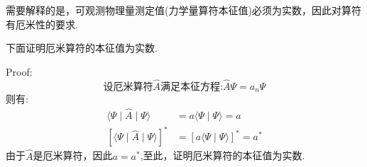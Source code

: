 \documentclass[28pt,openany]{book}
\begin{document}
需要解释的是，可观测物理量测定值(力学量算符本征值)必须为实数，因此对算符有厄米性的要求.

下面证明厄米算符的本征值为实数.

Proof:
$$\mbox{设厄米算符}\hat{A}\mbox{满足本征方程:}\hat{A}\Psi=a_{n}\Psi$$
\textbf{ }\textbf{ }\textbf{ }\textbf{ }\textbf{ }\textbf{ }则有:
\begin{align*}
    \langle \Psi \mid \hat{A} \mid \Psi \rangle&=a\langle \Psi \mid \Psi \rangle=a\\
    [\langle \Psi \mid \hat{A} \mid \Psi \rangle]^{*}&=[a\langle \Psi \mid \Psi \rangle]^{*}=a^{*}
\end{align*}
\textbf{ }\textbf{ }\textbf{ }\textbf{ }由于$\hat{A}$是厄米算符，因此$a=a^{*}$,至此，证明厄米算符的本征值为实数.
\end{document}
